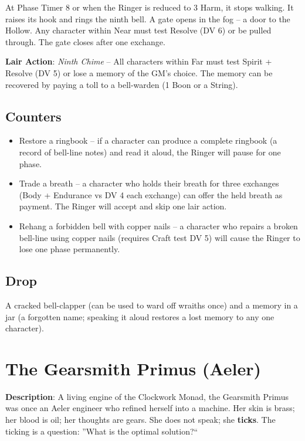 \noindent At Phase Timer 8 or when the Ringer is reduced to 3 Harm, it stops walking. It raises its hook and rings the ninth bell. A gate opens in the fog -- a door to the Hollow. Any character within Near must test Resolve (DV 6) or be pulled through. The gate closes after one exchange.

\noindent\textbf{Lair Action}: \emph{Ninth Chime} -- All characters within Far must test Spirit + Resolve (DV 5) or lose a memory of the GM's choice. The memory can be recovered by paying a toll to a bell-warden (1 Boon or a String).

\subsection*{Counters}

\begin{itemize}
    \item Restore a ringbook -- if a character can produce a complete ringbook (a record of bell-line notes) and read it aloud, the Ringer will pause for one phase.
    \item Trade a breath -- a character who holds their breath for three exchanges (Body + Endurance vs DV 4 each exchange) can offer the held breath as payment. The Ringer will accept and skip one lair action.
    \item Rehang a forbidden bell with copper nails -- a character who repairs a broken bell-line using copper nails (requires Craft test DV 5) will cause the Ringer to lose one phase permanently.
\end{itemize}

\subsection*{Drop}
\noindent A cracked bell-clapper (can be used to ward off wraiths once) and a memory in a jar (a forgotten name; speaking it aloud restores a lost memory to any one character).


\section*{The Gearsmith Primus (Aeler)}

\noindent\textbf{Description}: A living engine of the Clockwork Monad, the Gearsmith Primus was once an Aeler engineer who refined herself into a machine. Her skin is brass; her blood is oil; her thoughts are gears. She does not speak; she \textbf{ticks}. The ticking is a question: ''What is the optimal solution?``

